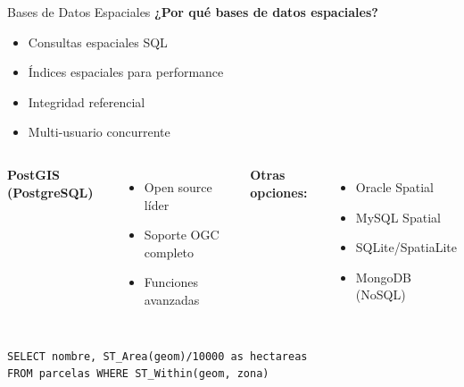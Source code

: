 \documentclass[10pt]{beamer}
\begin{document}
\begin{frame}{Bases de Datos Espaciales}
    \textbf{¿Por qué bases de datos espaciales?}
    \begin{itemize}
        \item Consultas espaciales SQL
        \item Índices espaciales para performance
        \item Integridad referencial
        \item Multi-usuario concurrente
    \end{itemize}
    
    \vspace{0.3cm}
    \begin{columns}
        \textbf{PostGIS (PostgreSQL)}
        \begin{itemize}
            \item Open source líder
            \item Soporte OGC completo
            \item Funciones avanzadas
        \end{itemize}
        
        \textbf{Otras opciones:}
        \begin{itemize}
            \item Oracle Spatial
            \item MySQL Spatial
            \item SQLite/SpatiaLite
            \item MongoDB (NoSQL)
        \end{itemize}
    \end{columns}
    
    \vspace{0.3cm}
    \begin{tcolorbox}[colframe=blue!50]
        \tiny
        \texttt{SELECT nombre, ST\_Area(geom)/10000 as hectareas\\
        FROM parcelas WHERE ST\_Within(geom, zona)}
    \end{tcolorbox}
\end{frame}
\end{document}
